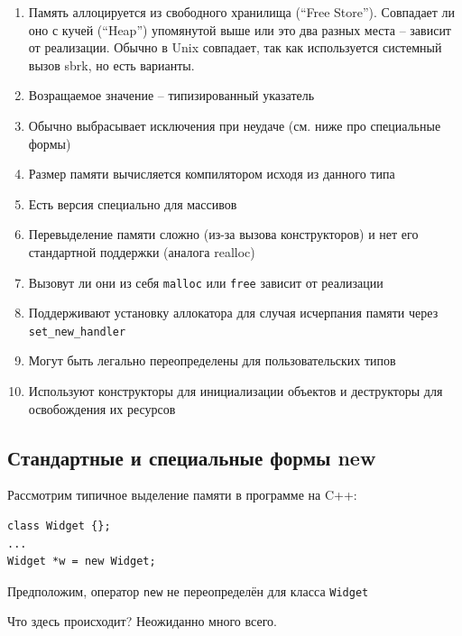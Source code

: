 \documentclass[a4paper,12pt,oneside]{book}
\begin{document}
\begin{enumerate}
\item
Память аллоцируется из свободного хранилища (``Free Store''). Совпадает ли оно с кучей (``Heap'') упомянутой выше или это два разных места -- зависит от реализации. Обычно в Unix совпадает, так как используется системный вызов sbrk, но есть варианты.
\item
Возращаемое значение -- типизированный указатель
\item
Обычно выбрасывает исключения при неудаче (см. ниже про специальные формы)
\item
Размер памяти вычисляется компилятором исходя из данного типа
\item
Есть версия специально для массивов
\item
Перевыделение памяти сложно (из-за вызова конструкторов) и нет его стандартной поддержки (аналога realloc)
\item
Вызовут ли они из себя \lstinline!malloc! или \lstinline!free! зависит от реализации
\item
Поддерживают установку аллокатора для случая исчерпания памяти через \lstinline!set_new_handler!
\item
Могут быть легально переопределены для пользовательских типов
\item
Используют конструкторы для инициализации объектов и деструкторы для освобождения их ресурсов
\end{enumerate}

\subsection{Стандартные и специальные формы new}\label{subsub:placementnew}

Рассмотрим типичное выделение памяти в программе на C++:

\begin{lstlisting}
class Widget {};
...
Widget *w = new Widget;
\end{lstlisting}

Предположим, оператор \lstinline!new! не переопределён для класса \lstinline!Widget!

Что здесь происходит? Неожиданно много всего.
\end{document}
